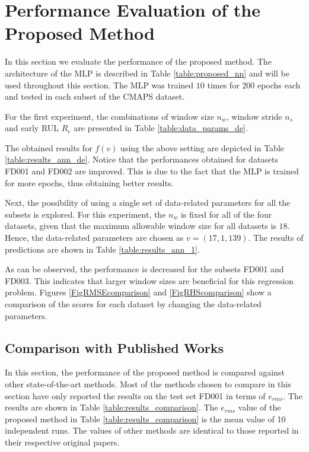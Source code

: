 \documentclass[12pt]{IEEEtran}%
\begin{document}
\section{Performance Evaluation of the Proposed Method}

\label{sec:rul_eval}

In this section we evaluate the performance of the proposed method. The
architecture of the MLP is described in Table \ref{table:proposed_nn} and will
be used throughout this section. The MLP was trained $10$ times for $200$
epochs each and tested in each subset of the CMAPS dataset.

For the first experiment, the combinations of window size $n_{w}$, window
stride $n_{s}$ and early RUL $R_{e}$ are presented in Table
\ref{table:data_params_de}.

The obtained results for $f(v)$ using the above setting are depicted in Table
\ref{table:results_ann_de}. Notice that the performances obtained for datasets
FD001 and FD002 are improved. This is due to the fact that the MLP is trained
for more epochs, thus obtaining better results.

Next, the possibility of using a single set of data-related parameters for all
the subsets is explored. For this experiment, the $n_{w}$ is fixed for all of
the four datasets, given that the maximum allowable window size for all
datasets is $18$. Hence, the data-related parameters are chosen as $v=(17, 1,
139)$. The results of predictions are shown in Table \ref{table:results_ann_1}.

As can be observed, the performance is decreased for the subsets FD001 and
FD003. This indicates that larger window sizes are beneficial for this
regression problem. Figures \ref{FigRMSEcomparison} and \ref{FigRHScomparison}
show a comparison of the scores for each dataset by changing the data-related
parameters.

\subsection{Comparison with Published Works}

In this section, the performance of the proposed method is compared against
other state-of-the-art methods. Most of the methods chosen to compare in this
section have only reported the results on the test set FD001 in terms of
$e_{rms}$. The results are shown in Table \ref{table:results_comparison}. The
$e_{rms}$ value of the proposed method in Table \ref{table:results_comparison}
is the mean value of 10 independent runs. The values of other methods are
identical to those reported in their respective original papers.
\end{document}
